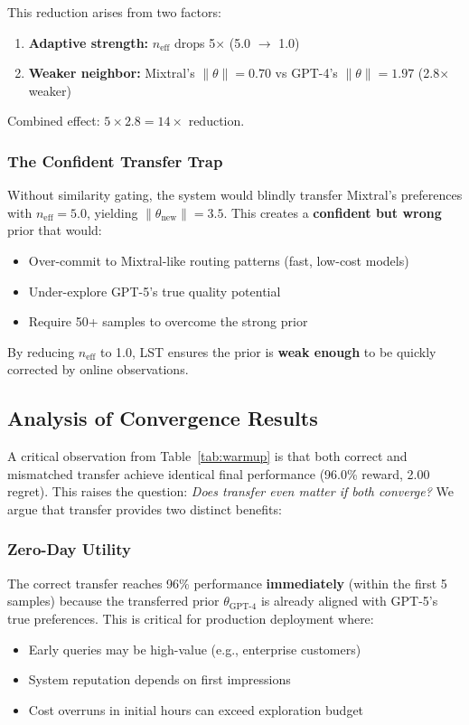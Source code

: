 \documentclass[sigconf,nonacm]{acmart}
\begin{document}
This reduction arises from two factors:
\begin{enumerate}
    \item \textbf{Adaptive strength:} $n_{\text{eff}}$ drops 5$\times$ (5.0 $\rightarrow$ 1.0)
    \item \textbf{Weaker neighbor:} Mixtral's $\|\theta\| = 0.70$ vs GPT-4's $\|\theta\| = 1.97$ (2.8$\times$ weaker)
\end{enumerate}

Combined effect: $5 \times 2.8 = 14\times$ reduction.

\subsubsection{The Confident Transfer Trap}

Without similarity gating, the system would blindly transfer Mixtral's preferences with $n_{\text{eff}} = 5.0$, yielding $\|\theta_{\text{new}}\| = 3.5$. This creates a \textbf{confident but wrong} prior that would:
\begin{itemize}
    \item Over-commit to Mixtral-like routing patterns (fast, low-cost models)
    \item Under-explore GPT-5's true quality potential
    \item Require 50+ samples to overcome the strong prior
\end{itemize}

By reducing $n_{\text{eff}}$ to 1.0, LST ensures the prior is \textbf{weak enough} to be quickly corrected by online observations.

\subsection{Analysis of Convergence Results}

A critical observation from Table~\ref{tab:warmup} is that both correct and mismatched transfer achieve identical final performance (96.0\% reward, 2.00 regret). This raises the question: \textit{Does transfer even matter if both converge?} We argue that transfer provides two distinct benefits:

\subsubsection{Zero-Day Utility}

The correct transfer reaches 96\% performance \textbf{immediately} (within the first 5 samples) because the transferred prior $\theta_{\text{GPT-4}}$ is already aligned with GPT-5's true preferences. This is critical for production deployment where:
\begin{itemize}
    \item Early queries may be high-value (e.g., enterprise customers)
    \item System reputation depends on first impressions
    \item Cost overruns in initial hours can exceed exploration budget
\end{itemize}
\end{document}
